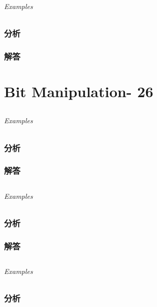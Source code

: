\documentclass[UTF8,a4paper,12pt]{ctexbook}
\begin{document}
	\subparagraph{Examples}
	
	\subsection{分析}
	
	\subsection{解答}
\chapter{Bit Manipulation- 26}
\section{}
	
	\subparagraph{Examples}
	
	\subsection{分析}
	
	\subsection{解答}
	
\section{}
	
	\subparagraph{Examples}
	
	\subsection{分析}
	
	\subsection{解答}
	
\section{}
	
	\subparagraph{Examples}
	
	\subsection{分析}
	
\end{document}
